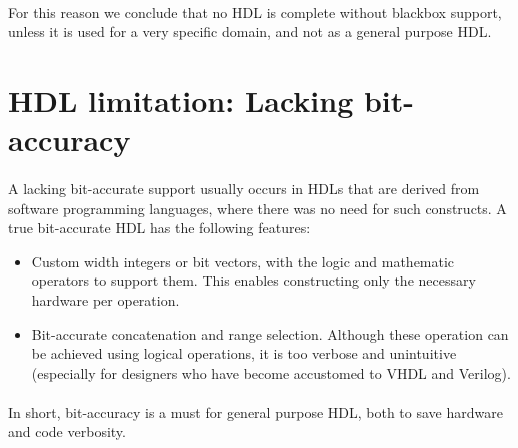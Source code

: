 \paragraph{}For this reason we conclude that no HDL is complete without blackbox support, unless it is used for a very specific domain, and not as a general purpose HDL.


\section{HDL limitation: Lacking bit-accuracy}
\label{sec:limitation bit-accuracy}
\paragraph{}A lacking bit-accurate support usually occurs in HDLs that are derived from software programming languages, where there was no need for such constructs. A true bit-accurate HDL has the following features:
\begin{itemize}
\item Custom width integers or bit vectors, with the logic and mathematic operators to support them. This enables constructing only the necessary hardware per operation.
\item Bit-accurate concatenation and range selection. Although these operation can be achieved using logical operations, it is too verbose and unintuitive (especially for designers who have become accustomed to VHDL and Verilog).
\end{itemize}
\paragraph{}In short, bit-accuracy is a must for general purpose HDL, both to save hardware and code verbosity. 





